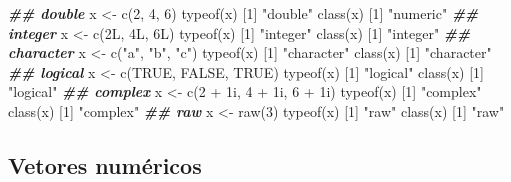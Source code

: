 \documentclass[
  10pt,
  a4paper]{book}
\newenvironment{Shaded}{\begin{snugshade}}{\end{snugshade}}
\newcommand{\ConstantTok}[1]{\textcolor[rgb]{0.00,0.00,0.00}{#1}}
\newcommand{\DecValTok}[1]{\textcolor[rgb]{0.00,0.00,0.81}{#1}}
\newcommand{\DocumentationTok}[1]{\textcolor[rgb]{0.56,0.35,0.01}{\textbf{\textit{#1}}}}
\newcommand{\FunctionTok}[1]{\textcolor[rgb]{0.00,0.00,0.00}{#1}}
\newcommand{\NormalTok}[1]{#1}
\newcommand{\OtherTok}[1]{\textcolor[rgb]{0.56,0.35,0.01}{#1}}
\newcommand{\SpecialCharTok}[1]{\textcolor[rgb]{0.00,0.00,0.00}{#1}}
\newcommand{\StringTok}[1]{\textcolor[rgb]{0.31,0.60,0.02}{#1}}
\begin{document}
\begin{Shaded}
\begin{Highlighting}[]
\DocumentationTok{\#\# double}
\NormalTok{x }\OtherTok{\textless{}{-}} \FunctionTok{c}\NormalTok{(}\DecValTok{2}\NormalTok{, }\DecValTok{4}\NormalTok{, }\DecValTok{6}\NormalTok{)}
\FunctionTok{typeof}\NormalTok{(x)}
\NormalTok{[}\DecValTok{1}\NormalTok{] }\StringTok{"double"}
\FunctionTok{class}\NormalTok{(x)}
\NormalTok{[}\DecValTok{1}\NormalTok{] }\StringTok{"numeric"}
\DocumentationTok{\#\# integer}
\NormalTok{x }\OtherTok{\textless{}{-}} \FunctionTok{c}\NormalTok{(2L, 4L, 6L)}
\FunctionTok{typeof}\NormalTok{(x)}
\NormalTok{[}\DecValTok{1}\NormalTok{] }\StringTok{"integer"}
\FunctionTok{class}\NormalTok{(x)}
\NormalTok{[}\DecValTok{1}\NormalTok{] }\StringTok{"integer"}
\DocumentationTok{\#\# character}
\NormalTok{x }\OtherTok{\textless{}{-}} \FunctionTok{c}\NormalTok{(}\StringTok{"a"}\NormalTok{, }\StringTok{"b"}\NormalTok{, }\StringTok{"c"}\NormalTok{)}
\FunctionTok{typeof}\NormalTok{(x)}
\NormalTok{[}\DecValTok{1}\NormalTok{] }\StringTok{"character"}
\FunctionTok{class}\NormalTok{(x)}
\NormalTok{[}\DecValTok{1}\NormalTok{] }\StringTok{"character"}
\DocumentationTok{\#\# logical}
\NormalTok{x }\OtherTok{\textless{}{-}} \FunctionTok{c}\NormalTok{(}\ConstantTok{TRUE}\NormalTok{, }\ConstantTok{FALSE}\NormalTok{, }\ConstantTok{TRUE}\NormalTok{)}
\FunctionTok{typeof}\NormalTok{(x)}
\NormalTok{[}\DecValTok{1}\NormalTok{] }\StringTok{"logical"}
\FunctionTok{class}\NormalTok{(x)}
\NormalTok{[}\DecValTok{1}\NormalTok{] }\StringTok{"logical"}
\DocumentationTok{\#\# complex}
\NormalTok{x }\OtherTok{\textless{}{-}} \FunctionTok{c}\NormalTok{(}\DecValTok{2} \SpecialCharTok{+}\NormalTok{ 1i, }\DecValTok{4} \SpecialCharTok{+}\NormalTok{ 1i, }\DecValTok{6} \SpecialCharTok{+}\NormalTok{ 1i)}
\FunctionTok{typeof}\NormalTok{(x)}
\NormalTok{[}\DecValTok{1}\NormalTok{] }\StringTok{"complex"}
\FunctionTok{class}\NormalTok{(x)}
\NormalTok{[}\DecValTok{1}\NormalTok{] }\StringTok{"complex"}
\DocumentationTok{\#\# raw}
\NormalTok{x }\OtherTok{\textless{}{-}} \FunctionTok{raw}\NormalTok{(}\DecValTok{3}\NormalTok{)}
\FunctionTok{typeof}\NormalTok{(x)}
\NormalTok{[}\DecValTok{1}\NormalTok{] }\StringTok{"raw"}
\FunctionTok{class}\NormalTok{(x)}
\NormalTok{[}\DecValTok{1}\NormalTok{] }\StringTok{"raw"}
\end{Highlighting}
\end{Shaded}

\hypertarget{vetores-numuxe9ricos}{%
\subsection{Vetores numéricos}\label{vetores-numuxe9ricos}}
\end{document}

